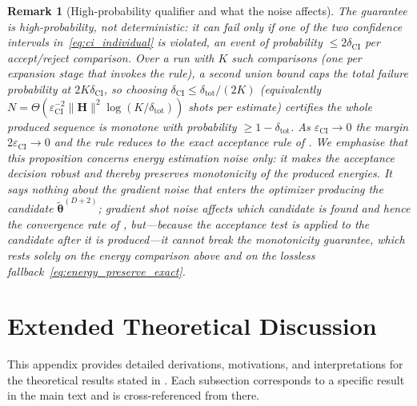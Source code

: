 \documentclass[11pt]{article}
\theoremstyle{plain}
\theoremstyle{plain}
\newtheorem{remark}[theorem]{Remark}
\begin{document}
\begin{remark}[High-probability qualifier and what the noise affects]
\label{rem:sampling_qualifier}
  The guarantee is high-probability, not deterministic: it can fail only
  if one of the two confidence intervals in~\eqref{eq:ci_individual} is
  violated, an event of probability $\le2\delta_{\mathrm{CI}}$ per
  accept/reject comparison.  Over a run with $K$ such comparisons (one
  per expansion stage that invokes the rule), a second union bound caps
  the total failure probability at $2K\delta_{\mathrm{CI}}$, so choosing
  $\delta_{\mathrm{CI}}\le\delta_{\mathrm{tot}}/(2K)$ (equivalently
  $N=\Theta(\varepsilon_{\mathrm{CI}}^{-2}\|\mathbf{H}\|^2
  \log(K/\delta_{\mathrm{tot}}))$ shots per estimate) certifies the
  whole produced sequence is monotone with probability
  $\ge1-\delta_{\mathrm{tot}}$.  As $\varepsilon_{\mathrm{CI}}\to0$ the
  margin $2\varepsilon_{\mathrm{CI}}\to0$ and the rule reduces to the
  exact acceptance rule of .  We emphasise that this
  proposition concerns \emph{energy} estimation noise only: it makes the
  \emph{acceptance decision} robust and thereby preserves monotonicity
  of the produced energies.  It says nothing about the \emph{gradient}
  noise that enters the optimizer producing the candidate
  $\tilde{\bm\theta}^{(D+2)}$; gradient shot noise affects \emph{which}
  candidate is found and hence the convergence rate of
  , but---because the acceptance test is applied to the
  candidate after it is produced---it cannot break the monotonicity
  guarantee, which rests solely on the energy comparison above and on
  the lossless fallback~\eqref{eq:energy_preserve_exact}.
\end{remark}
\section{Extended Theoretical Discussion}\label{app:theory_extended}
This appendix provides detailed derivations, motivations, and
interpretations for the theoretical results stated in
.  Each subsection corresponds to a specific result
in the main text and is cross-referenced from there.
\end{document}
